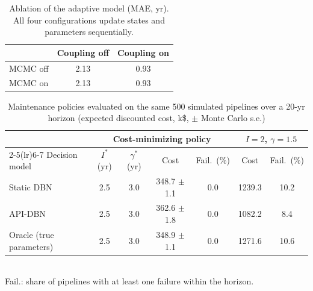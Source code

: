 \begin{table}[!t]
\centering
\caption{Ablation of the adaptive model (MAE, yr). All four configurations update states and parameters sequentially.}
\label{tab:A-ablation}
\begin{tabular}{lcc}
\toprule
 & Coupling off & Coupling on \\
\midrule
MCMC off & 2.13 & 0.93 \\
MCMC on & 2.13 & 0.93 \\
\bottomrule
\end{tabular}
\end{table}

\begin{table}[!t]
\centering
\caption{Maintenance policies evaluated on the same 500 simulated pipelines over a 20-yr horizon (expected discounted cost, k\$, $\pm$ Monte Carlo s.e.)}
\label{tab:A-maint}
\setlength{\tabcolsep}{3pt}
\begin{tabular}{lcccccc}
\toprule
 & \multicolumn{4}{c}{Cost-minimizing policy} & \multicolumn{2}{c}{$I=2$, $\gamma=1.5$} \\
\cmidrule(lr){2-5}\cmidrule(lr){6-7}
Decision model & $I^*$ (yr) & $\gamma^*$ (yr) & Cost & Fail.\ (\%) & Cost & Fail.\ (\%) \\
\midrule
Static DBN & 2.5 & 3.0 & 348.7 $\pm$ 1.1 & 0.0 & 1239.3 & 10.2 \\
API-DBN & 2.5 & 3.0 & 362.6 $\pm$ 1.8 & 0.0 & 1082.2 & 8.4 \\
Oracle (true parameters) & 2.5 & 3.0 & 348.9 $\pm$ 1.1 & 0.0 & 1271.6 & 10.6 \\
\bottomrule
\end{tabular}
\\[2pt]\footnotesize{Fail.: share of pipelines with at least one failure within the horizon.}
\end{table}

